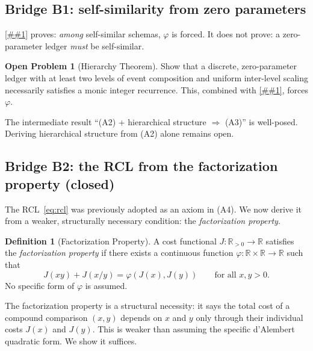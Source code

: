 \documentclass[11pt]{article}
\providecommand{\cref}[1]{\ref{##1}}%
\providecommand{\Cref}[1]{\ref{##1}}%
\newcommand{\R}{\mathbb{R}}
\newcommand{\Rp}{\mathbb{R}_{>0}}
\theoremstyle{definition}
\newtheorem{definition}[theorem]{Definition}
\newtheorem{openproblem}[theorem]{Open Problem}
\theoremstyle{remark}
\begin{document}
\subsection{Bridge B1: self-similarity from zero parameters}
\label{sec:bridge-b1}

\Cref{thm:phi} proves: \emph{among} self-similar schemas,
$\varphi$ is forced.
It does not prove: a zero-parameter ledger \emph{must} be
self-similar.

\begin{openproblem}[Hierarchy Theorem]
Show that a discrete, zero-parameter ledger with at least two
levels of event composition and uniform inter-level scaling
necessarily satisfies a monic integer recurrence.
This, combined with \cref{thm:phi}, forces $\varphi$.
\end{openproblem}

The intermediate result ``(A2) + hierarchical structure
$\Rightarrow$ (A3)'' is well-posed.
Deriving hierarchical structure from (A2) alone remains open.

\subsection{Bridge B2: the RCL from the factorization property
(closed)}
\label{sec:bridge-b2}

The RCL~\eqref{eq:rcl} was previously adopted as an axiom in (A4).
We now derive it from a weaker, structurally necessary condition:
the \emph{factorization property}.

\begin{definition}[Factorization Property]\label{def:factorization}
A cost functional $J : \Rp \to \R$ satisfies the \emph{factorization
property} if there exists a continuous function
$\varphi : \R \times \R \to \R$ such that
\begin{equation}\label{eq:factor}
J(xy) + J(x/y) = \varphi(J(x), J(y))
\qquad\text{for all } x, y > 0.
\end{equation}
No specific form of $\varphi$ is assumed.
\end{definition}

\noindent
The factorization property is a structural necessity: it says
the total cost of a compound comparison $(x, y)$ depends on
$x$ and $y$ only through their individual costs $J(x)$ and $J(y)$.
This is weaker than assuming the specific d'Alembert quadratic form.
We show it suffices.
\end{document}
